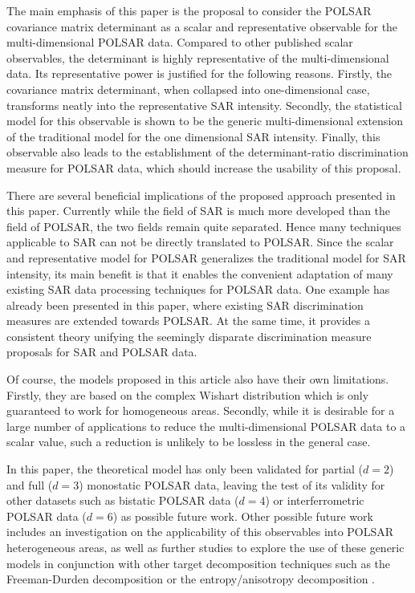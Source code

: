 \documentclass[journal]{IEEEtran}
\begin{document}
The main emphasis of this paper is the proposal to consider the POLSAR covariance matrix determinant as a scalar and representative observable for the multi-dimensional POLSAR data.
Compared to other published scalar observables, the determinant is highly representative of the multi-dimensional data.
Its representative power is justified for the following reasons.
Firstly, the covariance matrix determinant, when collapsed into one-dimensional case, transforms neatly into the representative SAR intensity.
Secondly, the statistical model for this observable is shown to be the generic multi-dimensional extension of the traditional model for the one dimensional SAR intensity.
Finally, this observable also leads to the establishment of the determinant-ratio discrimination measure for POLSAR data, which should increase the usability of this proposal.

There are several beneficial implications of the proposed approach presented in this paper.
Currently while the field of SAR is much more developed than the field of POLSAR,  the two fields remain  quite separated.
Hence many techniques applicable to SAR can not be directly translated to POLSAR.
Since the scalar and representative model for POLSAR generalizes the traditional model for SAR intensity,
  its main benefit is that it enables the convenient adaptation of many existing SAR data processing techniques for POLSAR data.
One example has already been presented in this paper, 
  where existing SAR discrimination measures are extended towards POLSAR.
At the same time, it provides a consistent theory unifying the seemingly disparate discrimination measure proposals for SAR and POLSAR data.  

Of course, the models proposed in this article also have their own limitations.
Firstly, they are based on the complex Wishart distribution
  which is only guaranteed to work for homogeneous areas.
Secondly, while it is desirable for a large number of applications to reduce the multi-dimensional POLSAR data to a scalar value, such a reduction is unlikely to be lossless in the general case.

In this paper, the theoretical model has only been validated for partial ($d=2$) and full ($d=3$) monostatic POLSAR data,
  leaving the test of its validity for other datasets such as bistatic POLSAR data ($d=4$) or interferrometric POLSAR data ($d=6$) as possible future work.
Other possible future work includes
  an investigation on the applicability of this observables into POLSAR heterogeneous areas,
  as well as further studies to explore the use of these generic models in conjunction with other target decomposition techniques
    such as the Freeman-Durden decomposition \cite{Freeman_1998_TGRS_963} or the entropy/anisotropy decomposition \cite{Cloude_1997_TGRS_68}.



\end{document}
